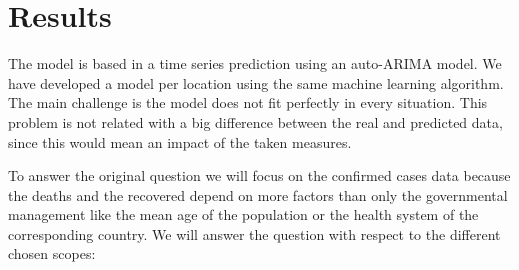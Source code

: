 \documentclass[lang=english,inputenc=utf8,fontsize=10pt]{ldvarticle}
\begin{document}
\section{Results}
The model is based in a time series prediction using an auto-ARIMA model. We have developed a model per location using the same machine learning algorithm. The main challenge is the model does not fit perfectly in every situation. This problem is not related with a big difference between the real and predicted data, since this would mean an impact of the taken measures.

To answer the original question we will focus on the confirmed cases data because the deaths and the recovered depend on more factors than only the governmental management like the mean age of the population or the health system of the corresponding country. We will answer the question with respect to the different chosen scopes:
\end{document}
